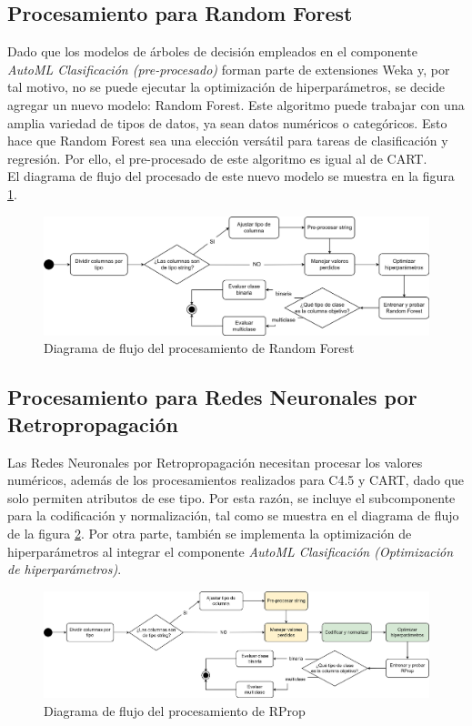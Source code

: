 \subsection{Procesamiento para Random Forest}
Dado que los modelos de árboles de decisión empleados en el componente \textit{AutoML Clasificación (pre-procesado)} forman parte de extensiones Weka y, por tal motivo, no se puede ejecutar la optimización de hiperparámetros, se decide agregar un nuevo modelo: Random Forest. Este algoritmo puede trabajar con una amplia variedad de tipos de datos, ya sean datos numéricos o categóricos. Esto hace que Random Forest sea una elección versátil para tareas de clasificación y regresión. Por ello, el pre-procesado de este algoritmo es igual al de CART. \\
El diagrama de flujo del procesado de este nuevo modelo se muestra en la figura \ref{fig:procesado-rf}.

\begin{figure}[H]
	\centering
	\includegraphics[width=1\linewidth]{"figuras/capi 2/modelos/procesado rf.drawio"}
	\caption{Diagrama de flujo del procesamiento de Random Forest}
	\label{fig:procesado-rf}
\end{figure}


\subsection{Procesamiento para Redes Neuronales por Retropropagación}
Las Redes Neuronales por Retropropagación necesitan procesar los valores numéricos, además de los procesamientos realizados para C4.5 y CART, dado que solo permiten atributos de ese tipo. Por esta razón, se incluye el subcomponente para la codificación y normalización, tal como se muestra en el diagrama de flujo de la figura \ref{fig:procesado-rprop}. Por otra parte, también se implementa la optimización de hiperparámetros al integrar el componente \textit{AutoML Clasificación (Optimización de hiperparámetros)}.

 \begin{figure}[H]
	\centering
	\includegraphics[width=1\linewidth]{"figuras/capi 2/modelos/procesado rprop.drawio"}
	\caption{Diagrama de flujo del procesamiento de RProp}
	\label{fig:procesado-rprop}
\end{figure}



